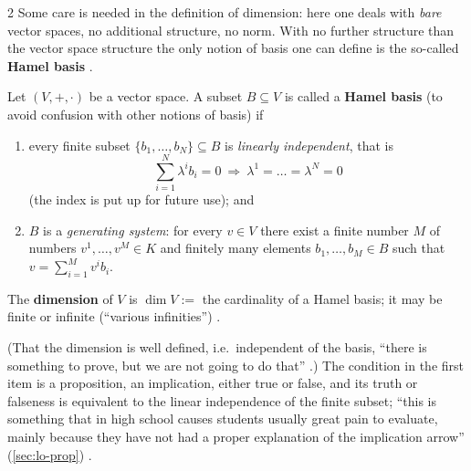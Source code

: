 \begin{paracol}{2}
Some care is needed in the definition of dimension: here one deals with \emph{bare} vector spaces, no additional structure, no norm. With no further structure than the vector space structure the only notion of basis one can define is the so-called \textbf{Hamel basis}
.
\begin{definition}\label{def:te-basis}
Let $(V,+,\cdot)$ be a vector space. A subset $B\subseteq V$ is called a \textbf{Hamel basis} (to avoid confusion with other notions of basis) if
\begin{enumerate}
  \item every finite subset $\{b_1,\dots,b_N\}\subseteq B$ is \emph{linearly independent}, that is
        \[
          \sum_{i=1}^N\lambda^ib_i=0\ \Longrightarrow\ \lambda^1=\dots=\lambda^N=0
        \]
        (the index is put up for future use); and
  \item $B$ is a \emph{generating system}: for every $v\in V$ there exist a finite number $M$ of numbers $v^1,\dots,v^M\in K$ and finitely many elements $b_1,\dots,b_M\in B$ such that $v=\sum_{i=1}^Mv^ib_i$.
\end{enumerate}
The \textbf{dimension} of $V$ is $\dim V:=$ the cardinality of a Hamel basis; it may be finite or infinite (``various infinities'')
.
\end{definition}
(That the dimension is well defined, i.e.\ independent of the basis, ``there is something to prove, but we are not going to do that'' .)
The condition in the first item is a proposition, an implication, either true or false, and its truth or falseness is equivalent to the linear independence of the finite subset; ``this is something that in high school causes students usually great pain to evaluate, mainly because they have not had a proper explanation
of the implication arrow'' (\cref{sec:lo-prop}) .


\end{paracol}
